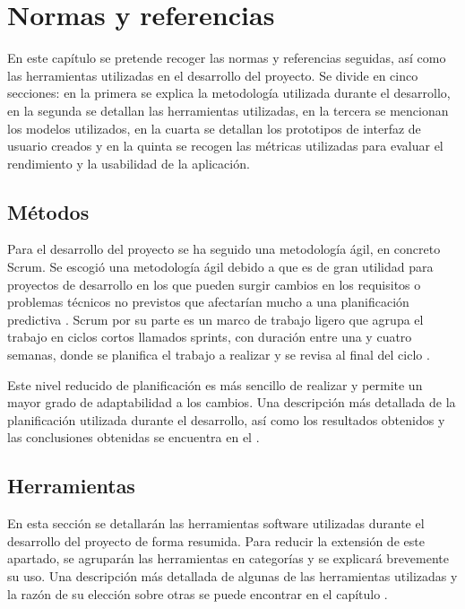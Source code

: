 \chapter{Normas y referencias}
\label{cap:normas}
En este capítulo se pretende recoger las normas y referencias seguidas, así como
las herramientas utilizadas en el desarrollo del proyecto. Se divide en cinco
secciones: en la primera se explica la metodología utilizada durante el
desarrollo, en la segunda se detallan las herramientas utilizadas, en la tercera
se mencionan los modelos utilizados, en la cuarta se detallan los prototipos de
interfaz de usuario creados y en la quinta se recogen las métricas utilizadas
para evaluar el rendimiento y la usabilidad de la aplicación.

\section{Métodos}
\label{sec:metodos}
Para el desarrollo del proyecto se ha seguido una metodología ágil, en concreto
Scrum. Se escogió una metodología ágil debido a que es de gran utilidad para
proyectos de desarrollo en los que pueden surgir cambios en los requisitos o
problemas técnicos no previstos que afectarían mucho a una planificación
predictiva \parencite{robert2003agile}. Scrum por su parte es un marco de
trabajo ligero que agrupa el trabajo en ciclos cortos llamados sprints, con
duración entre una y cuatro semanas, donde se planifica el trabajo a realizar y
se revisa al final del ciclo \parencite{schwaber2020scrum}.

Este nivel reducido de planificación es más sencillo de realizar y permite un
mayor grado de adaptabilidad a los cambios. Una descripción más detallada de la
planificación utilizada durante el desarrollo, así como los resultados obtenidos y
las conclusiones obtenidas se encuentra en el \tercerAnexo.

\section{Herramientas}
\label{sec:herramientas}
En esta sección se detallarán las herramientas software utilizadas durante el
desarrollo del proyecto de forma resumida. Para reducir la extensión de este
apartado, se agruparán las herramientas en categorías y se explicará brevemente
su uso. Una descripción más detallada de algunas de las herramientas utilizadas
y la razón de su elección sobre otras se puede encontrar en el capítulo
\textit{}.

